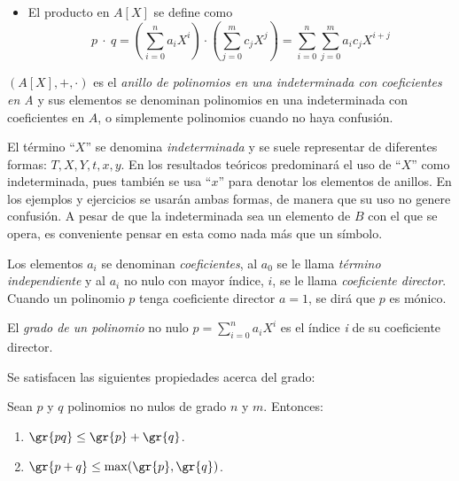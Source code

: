 \begin{deff}{\cite[p.~51]{Rosenberger}}
\begin{itemize}
        \item El producto en $A[X]$ se define como
        \[p \ \cdot \ q = \left(\sum\limits_{i=0}^n a_i X^i\right) \cdot \left(\sum\limits_{j=0}^m c_j X^j\right) = \sum\limits_{i=0}^{n} \sum\limits_{j = 0}^m a_i c_jX^{i+j}
        \]
    \end{itemize}

    \vspace{-1em}
    \item $(A[X], +,\cdot)$ es el \textit{anillo de polinomios en una indeterminada con coeficientes en A} y sus elementos se denominan polinomios en una indeterminada con coeficientes en $A$, o simplemente polinomios cuando no haya confusión.
\end{deff}

\begin{nott}
    \item El término ``$X$'' se denomina \textit{indeterminada} y se suele representar de diferentes formas: $T,X,Y, t, x, y$.
        En los resultados teóricos predominará el uso de ``$X$'' como indeterminada, pues también se usa ``$x$'' para denotar los elementos de anillos. En los ejemplos y ejercicios se usarán ambas formas, de manera que su uso no genere confusión.
    A pesar de que la indeterminada sea un elemento de $B$ con el que se opera, es conveniente pensar en esta como nada más que un símbolo.
    
    \item Los elementos $a_i$ se denominan \textit{coeficientes}, al $a_0$ se le llama \textit{término independiente} y al $a_i$ no nulo con mayor índice, $i$, se le llama \textit{coeficiente director}. Cuando un polinomio $p$ tenga coeficiente director $a = 1$, se dirá que $p$ es mónico.
\end{nott}



\begin{deff}{\cite[p~51]{Rosenberger}}
    El \textit{grado de un polinomio} no nulo $p = \sum\limits_{i=0}^{n} a_i X^i$ es el índice \textit{i} de su coeficiente director.
\end{deff}

    Se satisfacen las siguientes propiedades acerca del grado:
\begin{lema}{}\label{lema:grado_polinomios}
    Sean $p$ y $q$ polinomios no nulos de grado $n$ y $m$. Entonces:
    \begin{enumerate}[label=\roman*)]
        \item $\gr{pq} \leq \gr{p} + \gr{q}$.
        \item $\gr{p+q} \leq \max(\gr{p},\gr{q})$.
    \end{enumerate}
\end{lema}

